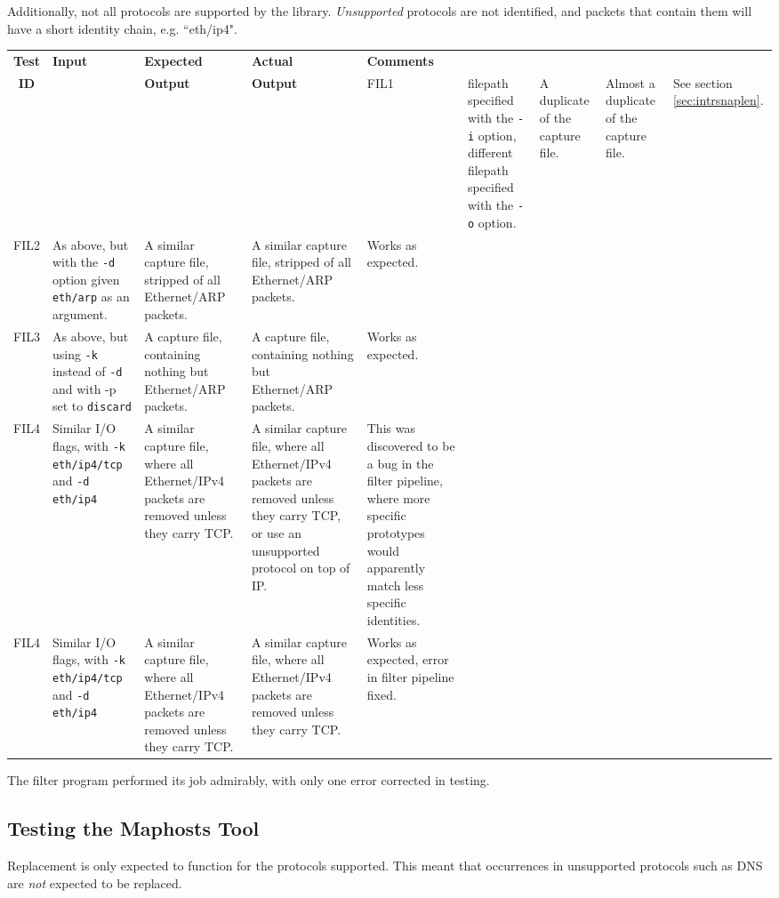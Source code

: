 \documentclass[10pt,a4paper,notitlepage]{report}
\begin{document}
Additionally, not all protocols are supported by the library. \emph{Unsupported} protocols are not identified, and packets that contain them will have a short identity chain, e.g. ``eth/ip4".

\begin{tabularx}{\textwidth}{|c|X|X|X|X|}
\hline
\textbf{Test} & \textbf{Input} & \textbf{Expected} & \textbf{Actual} & \textbf{Comments}\\
\textbf{ID} & & \textbf{Output} & \textbf{Output} &
\endhead
\hline
FIL1 & filepath specified with the \texttt{-i} option, different filepath specified with the \texttt{-o} option. &
	A duplicate of the capture file. &
	Almost a duplicate of the capture file. &
	See section \ref{sec:intrsnaplen}. \\ \hline
FIL2 & As above, but with the \texttt{-d} option given \texttt{eth/arp} as an argument. &
	A similar capture file, stripped of all Ethernet/ARP packets. &
	A similar capture file, stripped of all Ethernet/ARP packets. &
	Works as expected. \\ \hline
FIL3 & As above, but using \texttt{-k} instead of \texttt{-d} and with {-p} set to \texttt{discard} &
	A capture file, containing nothing but Ethernet/ARP packets. &
	A capture file, containing nothing but Ethernet/ARP packets. &
	Works as expected. \\ \hline
FIL4 & Similar I/O flags, with \texttt{-k eth/ip4/tcp} and \texttt{-d eth/ip4} &
	A similar capture file, where all Ethernet/IPv4 packets are removed unless they carry TCP. &
	A similar capture file, where all Ethernet/IPv4 packets are removed unless they carry TCP, or use an unsupported protocol on top of IP. &
	This was discovered to be a bug in the filter pipeline, where more specific prototypes would apparently match less specific identities. \\ \hline
FIL4 & Similar I/O flags, with \texttt{-k eth/ip4/tcp} and \texttt{-d eth/ip4} &
	A similar capture file, where all Ethernet/IPv4 packets are removed unless they carry TCP. &
	A similar capture file, where all Ethernet/IPv4 packets are removed unless they carry TCP. &
	Works as expected, error in filter pipeline fixed. \\ \hline
\end{tabularx}

The filter program performed its job admirably, with only one error corrected in testing.

\subsection{Testing the Maphosts Tool}
Replacement is only expected to function for the protocols supported. This meant that occurrences in unsupported protocols such as DNS are \emph{not} expected to be replaced.
\end{document}
